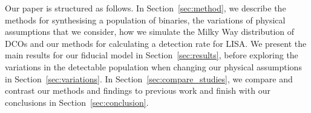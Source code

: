 Our paper is structured as follows. In Section~\ref{sec:method}, we describe the methods for synthesising a population of binaries, the variations of physical assumptions that we consider, how we simulate the Milky Way distribution of DCOs and our methods for calculating a detection rate for LISA. We present the main results for our fiducial model in Section~\ref{sec:results}, before exploring the variations in the detectable population when changing our physical assumptions in Section~\ref{sec:variations}. In Section~\ref{sec:compare_studies}, we compare and contrast our methods and findings to previous work and finish with our conclusions in Section~\ref{sec:conclusion}.